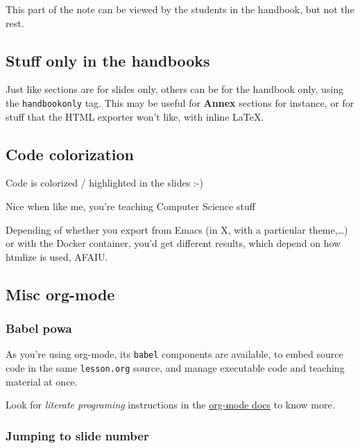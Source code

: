\documentclass[a4paper]{article}
\begin{document}
\begin{NOTES}


This part of the note can be viewed by the students in the handbook,
but not the rest.
\end{NOTES}

\subsection{Stuff only in the handbooks}
\label{sec:org9f16fd8}

Just like sections are for slides only, others can be for the handbook
only, using the \texttt{handbookonly} tag. This may be useful for \textbf{Annex}
sections for instance, or for stuff that the HTML exporter won't like, with inline \LaTeX{}.

\subsection{Code colorization}
\label{sec:org818017a}
Code is colorized / highlighted in the slides :-)

\begin{NOTES}
Nice when like me, you're teaching Computer Science stuff

Depending of whether you export from Emacs (in X, with a particular
theme,\ldots{}) or with the Docker container, you'd get different results,
which depend on how htmlize is used, AFAIU.
\end{NOTES}

\subsection{Misc org-mode}
\label{sec:orge09d94a}

\subsubsection{Babel powa}
\label{sec:orgcf0448e}
As you're using org-mode, its \texttt{babel} components are available, to embed source code in the same \texttt{lesson.org} source, and manage executable code and teaching material at once.

Look for \emph{literate programing} instructions in the \href{http://orgmode.org/manual/Working-with-source-code.html}{org-mode docs} to know more.

\subsubsection{Jumping to slide number}
\label{sec:org5c08448}
\end{document}
